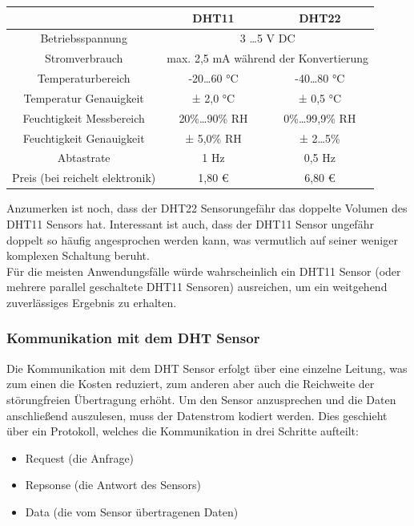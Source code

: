 \begin{adjustwidth}{-1in}{-1in}%
	\begin{center}
	
	        \begin{tabular}{ccc}
			\toprule
			 & \textbf{DHT11} & \textbf{DHT22}\\

			\midrule
			Betriebsspannung & \multicolumn{2}{c}{3 \dots 5 V DC}\\
			Stromverbrauch & \multicolumn{2}{c}{max. 2,5 mA während der Konvertierung}\\
			Temperaturbereich & -20\dots 60 °C & -40\dots 80 °C  \\
			Temperatur Genauigkeit & ± 2,0 °C & ± 0,5 °C\\
			Feuchtigkeit Messbereich & 20\%\dots90\% RH & 0\%\dots99,9\% RH\\
			Feuchtigkeit Genauigkeit & ± 5,0\% RH & ± 2\dots5\%\\
			Abtastrate & 1 Hz & 0,5 Hz \\

			\midrule
			Preis (bei reichelt elektronik) & 1,80 € & 6,80 €\\

			\bottomrule
	
	        \end{tabular}
		\label{}
		 \label{tab:vergleichDHT} 
	\end{center}
\end{adjustwidth}

Anzumerken ist noch, dass der DHT22 Sensorungefähr das doppelte Volumen des DHT11 Sensors hat. Interessant ist auch, dass der DHT11 Sensor ungefähr doppelt so häufig angesprochen werden kann, was vermutlich auf seiner weniger komplexen Schaltung beruht.\\
Für die meisten Anwendungsfälle würde wahrscheinlich ein DHT11 Sensor (oder mehrere parallel geschaltete DHT11 Sensoren) ausreichen, um ein weitgehend zuverlässiges Ergebnis zu erhalten.

\subsubsection{Kommunikation mit dem DHT Sensor\cite{dht}} 

Die Kommunikation mit dem DHT Sensor erfolgt über eine einzelne Leitung, was zum einen die Kosten reduziert, zum anderen aber auch die Reichweite der störungfreien Übertragung erhöht. Um den Sensor anzusprechen und die Daten anschließend auszulesen, muss der Datenstrom kodiert werden. Dies geschieht über ein Protokoll, welches die Kommunikation in drei Schritte aufteilt:
\begin{itemize} 
	\item Request (die Anfrage)
	\item Repsonse (die Antwort des Sensors)
	\item Data (die vom Sensor übertragenen Daten)
\end{itemize}


